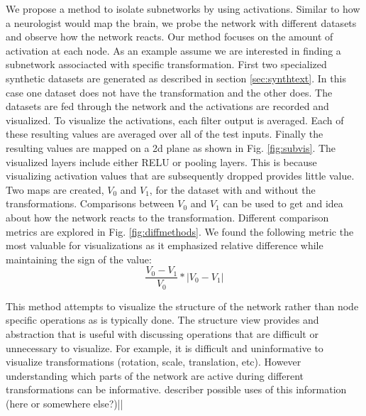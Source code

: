 \documentclass[10pt,twocolumn,letterpaper]{article}
\begin{document}
We propose a method to isolate subnetworks by using activations. Similar to how a neurologist would map the brain, we probe the network with different datasets and observe how the network reacts. Our method focuses on the amount of activation at each node. As an example assume we are interested in finding a subnetwork associacted with specific transformation. First two specialized synthetic datasets are generated as described in section \ref{sec:synthtext}. In this case one dataset does not have the transformation and the other does. The datasets are fed through the network and the activations are recorded and visualized. To visualize the activations, each filter output is averaged. Each of these resulting values are averaged over all of the test inputs. Finally the resulting values are mapped on a 2d plane as shown in Fig. \ref{fig:subvis}. The visualized layers include either RELU or pooling layers. This is because visualizing activation values that are subsequently dropped provides little value. Two maps are created, $V_0$ and $V_1$, for the dataset with and without the transformations. Comparisons between $V_0$ and $V_1$ can be used to get and idea about how the network reacts to the transformation. Different comparison metrics are explored in Fig. \ref{fig:diffmethods}. We found the following metric the most valuable for visualizations as it emphasized relative difference while maintaining the sign of the value: $$\frac{V_0-V_1}{V_0} * |V_0-V_1|$$

This method attempts to visualize the structure of the network rather than node specific operations as is typically done. The structure view provides and abstraction that is useful with discussing operations that are difficult or unnecessary to visualize. For example, it is difficult and uninformative to visualize transformations (rotation, scale, translation, etc). However understanding which parts of the network are active during different transformations can be informative.
describer possible uses of this information (here or somewhere else?)||
\end{document}
